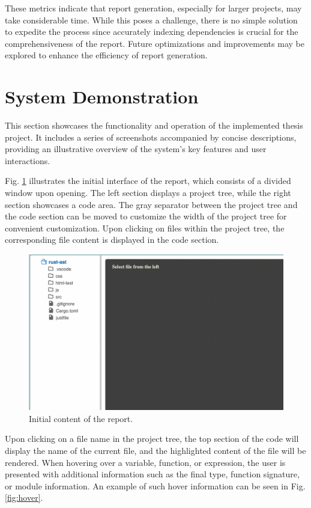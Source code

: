 These metrics indicate that report generation, especially for larger projects, may take considerable time. While this poses a challenge, there is no simple solution to expedite the process since accurately indexing dependencies is crucial for the comprehensiveness of the report. Future optimizations and improvements may be explored to enhance the efficiency of report generation.

\section{System Demonstration}

This section showcases the functionality and operation of the implemented thesis project. It includes a series of screenshots accompanied by concise descriptions, providing an illustrative overview of the system's key features and user interactions. 

Fig. \ref{fig:initial} illustrates the initial interface of the report, which consists of a divided window upon opening. The left section displays a project tree, while the right section showcases a code area. The gray separator between the project tree and the code section can be moved to customize the width of the project tree for convenient customization. Upon clicking on files within the project tree, the corresponding file content is displayed in the code section. 


\begin{figure}[ht]
\centering
\includegraphics[width=15cm]{figs/screenshots/initial.png}
\caption{Initial content of the report.}
\label{fig:initial}
\end{figure}


Upon clicking on a file name in the project tree, the top section of the code will display the name of the current file, and the highlighted content of the file will be rendered. When hovering over a variable, function, or expression, the user is presented with additional information such as the final type, function signature, or module information. An example of such hover information can be seen in Fig. \ref{fig:hover}.

